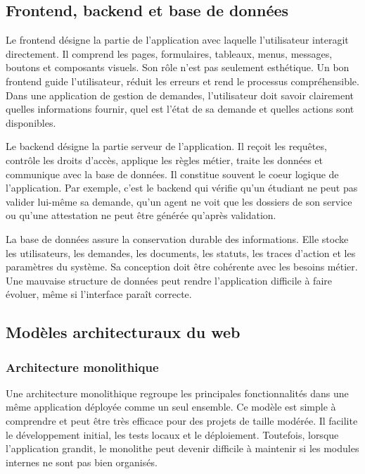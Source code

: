 \subsection{Frontend, backend et base de données}

Le frontend désigne la partie de l'application avec laquelle l'utilisateur interagit directement. Il comprend les pages, formulaires, tableaux, menus, messages, boutons et composants visuels. Son rôle n'est pas seulement esthétique. Un bon frontend guide l'utilisateur, réduit les erreurs et rend le processus compréhensible. Dans une application de gestion de demandes, l'utilisateur doit savoir clairement quelles informations fournir, quel est l'état de sa demande et quelles actions sont disponibles.

Le backend désigne la partie serveur de l'application. Il reçoit les requêtes, contrôle les droits d'accès, applique les règles métier, traite les données et communique avec la base de données. Il constitue souvent le coeur logique de l'application. Par exemple, c'est le backend qui vérifie qu'un étudiant ne peut pas valider lui-même sa demande, qu'un agent ne voit que les dossiers de son service ou qu'une attestation ne peut être générée qu'après validation.

La base de données assure la conservation durable des informations. Elle stocke les utilisateurs, les demandes, les documents, les statuts, les traces d'action et les paramètres du système. Sa conception doit être cohérente avec les besoins métier. Une mauvaise structure de données peut rendre l'application difficile à faire évoluer, même si l'interface paraît correcte.

\subsection{Modèles architecturaux du web}

\subsubsection{Architecture monolithique}

Une architecture monolithique regroupe les principales fonctionnalités dans une même application déployée comme un seul ensemble. Ce modèle est simple à comprendre et peut être très efficace pour des projets de taille modérée. Il facilite le développement initial, les tests locaux et le déploiement. Toutefois, lorsque l'application grandit, le monolithe peut devenir difficile à maintenir si les modules internes ne sont pas bien organisés.


